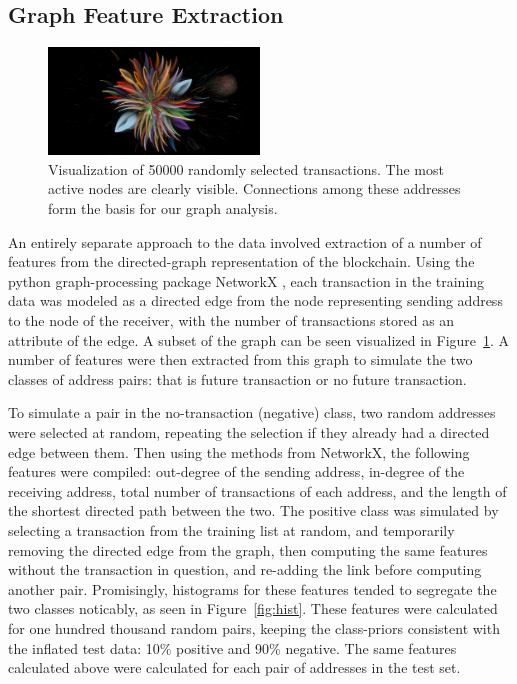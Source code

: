 \documentclass{article} %
\begin{document}
\subsection{Graph Feature Extraction}
\begin{figure}
 \includegraphics[trim={6cm 2cm 6cm 2cm},clip,width=5.6cm]{50000visualization.png}
\caption{Visualization of 50000 randomly selected transactions. The most active nodes are clearly visible. Connections among these addresses form the basis for our graph analysis.}
\label{fig:vis}
\end{figure}

An entirely separate approach to the data involved extraction of a number of features from the directed-graph representation of the blockchain.  Using the python graph-processing package NetworkX \cite{nx}, each transaction in the training data was modeled as a directed edge from the node representing sending address to the node of the receiver, with the number of transactions stored as an attribute of the edge.  A subset of the graph can be seen visualized in Figure~\ref{fig:vis}. A number of features were then extracted from this graph to simulate the two classes of address pairs: that is future transaction or no future transaction.

To simulate a pair in the no-transaction (negative) class, two random addresses were selected at random, repeating the selection if they already had a directed edge between them.  Then using the methods from NetworkX, the following features were compiled: out-degree of the sending address, in-degree of the receiving address, total number of transactions of each address, and the length of the shortest directed path between the two.  The positive class was simulated by selecting a transaction from the training list at random, and temporarily removing the directed edge from the graph, then computing the same features without the transaction in question, and re-adding the link before computing another pair.  Promisingly, histograms for these features tended to segregate the two classes noticably, as seen in Figure~\ref{fig:hist}.  These features were calculated for one hundred thousand random pairs, keeping the class-priors consistent with the inflated test data: 10\% positive and 90\% negative.  The same features calculated above were calculated for each pair of addresses in the test set.  
\end{document}
